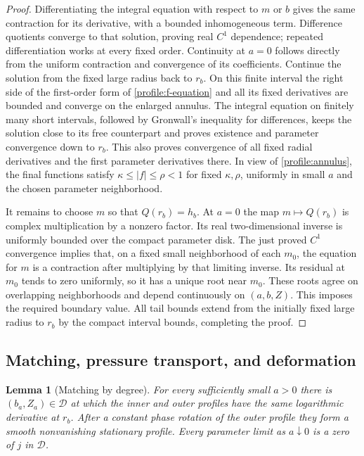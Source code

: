 \documentclass[11pt]{article}
\numberwithin{equation}{section}
\newtheorem{lemma}[theorem]{Lemma}
\theoremstyle{definition}
\theoremstyle{remark}
\begin{document}
\begin{proof}
Differentiating the integral equation with respect to $m$ or $b$ gives
the same contraction for its derivative, with a bounded inhomogeneous
term.  Difference quotients converge to that solution, proving real
$C^1$ dependence; repeated differentiation works at every fixed order.
Continuity at $a=0$ follows directly from the uniform contraction and
convergence of its coefficients.  Continue the solution from the fixed
large radius back to $r_b$.  On this finite interval the right side of
the first-order form of \eqref{profile:f-equation} and all its fixed
derivatives are bounded and converge on the enlarged annulus.  The
integral equation on finitely many short intervals, followed by
Gronwall's inequality for differences, keeps the solution close to its
free counterpart and proves existence and parameter convergence down
to $r_b$.  This also proves convergence of all fixed radial derivatives
and the first parameter derivatives there.  In view of
\eqref{profile:annulus}, the final functions satisfy
$\kappa\le|f|\le\rho<1$ for fixed $\kappa,\rho$, uniformly in small
$a$ and the chosen parameter neighborhood.

It remains to choose $m$ so that $Q(r_b)=h_b$.  At $a=0$ the map
$m\mapsto Q(r_b)$ is complex multiplication by a nonzero factor.
Its real two-dimensional inverse is uniformly bounded over the compact
parameter disk.  The just proved $C^1$ convergence implies that, on a
fixed small neighborhood of each $m_0$, the equation for $m$ is a
contraction after multiplying by that limiting inverse.  Its residual
at $m_0$ tends to zero uniformly, so it has a unique root near $m_0$.
These roots agree on overlapping neighborhoods and depend continuously
on $(a,b,Z)$.  This imposes the required boundary value.  All tail bounds
extend from the initially fixed large radius to $r_b$ by the compact
interval bounds, completing the proof.
\end{proof}

\subsection{Matching, pressure transport, and deformation}

\begin{lemma}[Matching by degree]\label{profile:matching}
For every sufficiently small $a>0$ there is $(b_a,Z_a)\in\mathcal D$
at which the inner and outer profiles have the same logarithmic
derivative at $r_b$.  After a constant phase rotation of the outer
profile they form a smooth nonvanishing stationary profile.  Every
parameter limit as $a\downarrow0$ is a zero of $j$ in $\mathcal D$.
\end{lemma}
\end{document}
